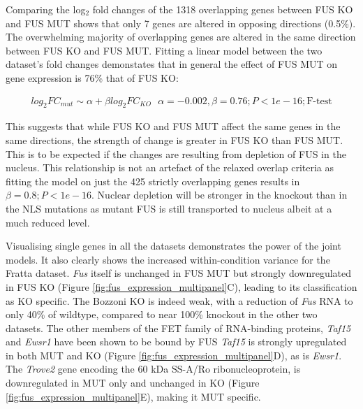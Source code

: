Comparing the log$_2$ fold changes of the 1318 overlapping genes between FUS KO and FUS MUT shows that only 7 genes are altered in opposing directions (0.5\%).
The overwhelming majority of overlapping genes are altered in the same direction between FUS KO and FUS MUT.
Fitting a linear model between the two dataset's fold changes demonstates that in general the effect of FUS MUT on gene expression is 76\% that of FUS KO:

\begin{align*}
log_2FC_{mut} \sim \alpha + \beta log_2FC_{KO} \text{ } \alpha = -0.002, \beta = 0.76; P < 1e-16; \text{F-test} 
\end{align*}

This suggests that while FUS KO and FUS MUT affect the same genes in the same directions, the strength of change is greater in FUS KO than FUS MUT. This is to be expected if the changes are resulting from depletion of FUS in the nucleus. This relationship is not an artefact of the relaxed overlap criteria as fitting the model on just the 425 strictly overlapping genes results in $\beta = 0.8; P < 1e-16$.
Nuclear depletion will be stronger in the knockout than in the NLS mutations as mutant FUS is still transported to nucleus albeit at a much reduced level.

Visualising single genes in all the datasets demonstrates the power of the joint models.
It also clearly shows the increased within-condition variance for the Fratta dataset.
\textit{Fus} itself is unchanged in FUS MUT but strongly downregulated in FUS KO (Figure \ref{fig:fus_expression_multipanel}C), leading to its classification as KO specific.
The Bozzoni KO is indeed weak, with a reduction of \textit{Fus} RNA to only 40\% of wildtype, compared to near 100\% knockout in the other two datasets.
The other members of the FET family of RNA-binding proteins,  \textit{Taf15} and \textit{Ewsr1} have been shown to be bound by FUS \cite{Scekic-zahirovic2016} %
\textit{Taf15} is strongly upregulated in both MUT and KO (Figure \ref{fig:fus_expression_multipanel}D), as is \textit{Ewsr1}.
The \textit{Trove2} gene encoding the 60 kDa SS-A/Ro ribonucleoprotein,  is downregulated in MUT only and unchanged in KO (Figure \ref{fig:fus_expression_multipanel}E), making it MUT specific.

